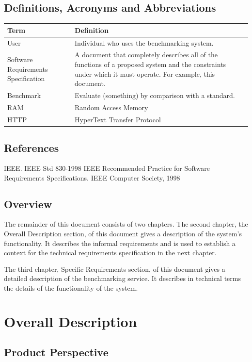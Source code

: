 \documentclass[a4paper,12pt]{article}
\begin{document}
\subsection{Definitions, Acronyms and Abbreviations}
\begin{center}
\begin{tabular}{ |p{5cm}|p{10cm}| } 
\hline
Term & Definition \\ 
\hline
User & Individual who uses the benchmarking system. \\ 
\hline
Software Requirements Specification & A document that completely describes all of the functions of a proposed system and the constraints under which it must operate. For example, this document. \\ 
\hline
Benchmark & Evaluate (something) by comparison with a standard. \\
\hline
RAM & Random Access Memory  \\
\hline
HTTP & HyperText Transfer Protocol \\
\hline
\end{tabular}
\end{center}

\subsection{References}
IEEE. IEEE Std 830-1998 IEEE Recommended Practice for Software Requirements Specifications. IEEE Computer Society, 1998

\subsection{Overview}
The remainder of this document consists of two chapters. The second chapter, the Overall Description section, of this document gives a description of the system's functionality. It describes the informal requirements and is used to establish a context for the technical requirements specification in the next chapter.

The third chapter, Specific Requirements section, of this document gives a detailed description of the benchmarking service. It describes in technical terms the details of the functionality of the system.

\section{Overall Description}



\subsection{Product Perspective}
\end{document}
